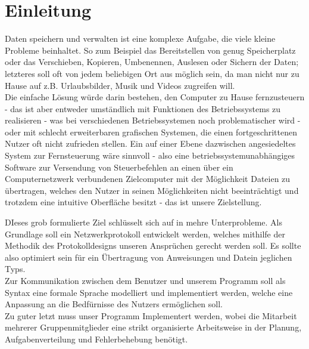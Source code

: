 \documentclass[12pt,a4paper]{scrartcl}
\begin{document}
\section*{Einleitung}
Daten speichern und verwalten ist eine komplexe Aufgabe, die viele kleine Probleme beinhaltet. So zum Beispiel das Bereitstellen von genug Speicherplatz oder das Verschieben, Kopieren, Umbenennen, Auslesen oder Sichern der Daten; letzteres soll oft von jedem beliebigen Ort aus möglich sein, da man nicht nur zu Hause auf z.B. Urlaubsbilder, Musik und Videos zugreifen will.\\
Die einfache Lösung würde darin bestehen, den Computer zu Hause fernzusteuern - das ist aber entweder umständlich mit Funktionen des Betriebssystems zu realisieren - was bei verschiedenen Betriebssystemen noch problematischer wird - oder mit schlecht erweiterbaren grafischen Systemen, die einen fortgeschrittenen Nutzer oft nicht zufrieden stellen.
Ein auf einer Ebene dazwischen angesiedeltes System zur Fernsteuerung wäre sinnvoll - also eine betriebssystemunabhängiges Software zur Versendung von Steuerbefehlen an einen über ein Computernetzwerk verbundenen Zielcomputer mit der Möglichkeit Dateien zu übertragen, welches den Nutzer in seinen Möglichkeiten nicht beeinträchtigt und trotzdem eine intuitive Oberfläche besitzt - das ist unsere Zielstellung.


DIeses grob formulierte Ziel schlüsselt sich auf in mehre Unterprobleme. Als Grundlage soll ein Netzwerkprotokoll entwickelt werden, welches mithilfe der Methodik des Protokolldesigns unseren Ansprüchen gerecht werden soll. Es sollte also optimiert sein für ein Übertragung von Anweisungen und Datein jeglichen Typs.\\ 
Zur Kommunikation zwischen dem Benutzer und unserem Programm soll als Syntax eine formale Sprache modelliert und implementiert werden, welche eine Anpassung an die Bedfürnisse des Nutzers ermöglichen soll.\\
Zu guter letzt muss unser Programm Implementert werden, wobei die Mitarbeit mehrerer Gruppenmitglieder eine strikt organisierte Arbeitsweise in der Planung, Aufgabenverteilung und Fehlerbehebung benötigt.  
\end{document}
